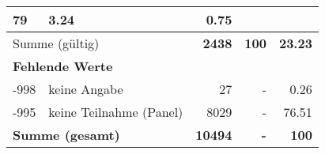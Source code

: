 \begin{longtable}{lXrrr}
       \num{79} &
       \num[round-mode=places,round-precision=2]{3,24} &
         \num[round-mode=places,round-precision=2]{0,75} \\
     \midrule
     \multicolumn{2}{l}{Summe (gültig)} &
       \textbf{\num{2438}} &
     \textbf{100} &
       \textbf{\num[round-mode=places,round-precision=2]{23,23}} \\
     \multicolumn{5}{l}{\textbf{Fehlende Werte}}\\
       -998 &
       keine Angabe &
         \num{27} &
        - &
         \num[round-mode=places,round-precision=2]{0,26} \\
       -995 &
       keine Teilnahme (Panel) &
         \num{8029} &
        - &
         \num[round-mode=places,round-precision=2]{76,51} \\
     \midrule
     \multicolumn{2}{l}{\textbf{Summe (gesamt)}} &
          \textbf{\num{10494}} &
        \textbf{-} &
        \textbf{100} \\
     \bottomrule
     \end{longtable}
     
